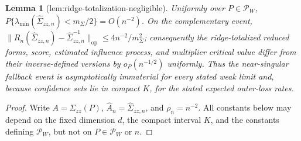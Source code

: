 \documentclass{article}
\newtheorem{lemma}{Lemma}
\begin{document}
\begin{lemma}[lem:ridge-totalization-negligible]\label{lem:ridge-totalization-negligible}
Uniformly over \(P\in\mathcal P_W\), \(P\{\lambda_{\min}(\widehat\Sigma_{zz,n})<m_{\Sigma}/2\}=O(n^{-2})\). On the complementary event, \(\|R_n(\widehat\Sigma_{zz,n})-\widehat\Sigma_{zz,n}^{-1}\|_{\mathrm{op}}\leq4n^{-2}/m_{\Sigma}^2\); consequently the ridge-totalized reduced forms, score, estimated influence process, and multiplier critical value differ from their inverse-defined versions by \(o_P(n^{-1/2})\) uniformly. Thus the near-singular fallback event is asymptotically immaterial for every stated weak limit and, because confidence sets lie in compact \(K\), for the stated expected outer-loss rates.
\end{lemma}
\begin{proof}
Write \(A=\Sigma_{zz}(P)\), \(\widehat A_n=\widehat\Sigma_{zz,n}\), and \(\rho_n=n^{-2}\). All constants below may depend on the fixed dimension \(d\), the compact interval \(K\), and the constants defining \(\mathcal P_W\), but not on \(P\in\mathcal P_W\) or \(n\).


\end{proof}
\end{document}
